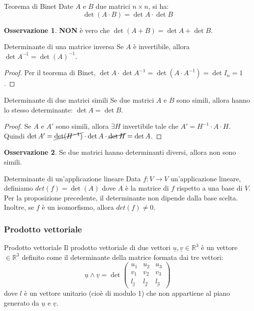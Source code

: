 \documentclass[a4paper]{article}
\theoremstyle{definition}
\newtheorem*{oss}{Osservazione}
\begin{document}
\begin{teo}{Teorema di Binet}{}
	Date $A$ e $B$ due matrici $n \times n$, si ha:
	\begin{equation*}
		\det(A \cdot B) = \det A \cdot \det B
	\end{equation*}
	\begin{oss}
		\textbf{NON} è vero che $\det(A + B) = \det A + \det B$.
	\end{oss}
\end{teo}
\begin{cor}{Determinante di una matrice inversa}{}
	Se $A$ è invertibile, allora $\det A^{-1} = \det(A)^{-1}$.
\end{cor}
\begin{proof}
	Per il teorema di Binet, $\det A \cdot \det A^{-1} = \det(A \cdot A^{-1}) = \det I_n = 1$.
\end{proof}
\begin{cor}{Determinante di due matrici simili}{}
	Se due matrici $A$ e $B$ sono simili, allora hanno lo stesso determinante: $\det A = \det B$.
\end{cor}
\begin{proof}
	Se $A$ e $A'$ sono simili, allora $\exists H$ invertibile tale che $A' = H^{-1} \cdot A \cdot H$.
	Quindi $\det A' = \cancel{\det(H^{-1})} \cdot \det A \cdot \cancel{\det H} = \det A$.
\end{proof}

\begin{oss}
	Se due matrici hanno determinanti diversi, allora non sono simili.
\end{oss}

\begin{deff}{Determinante di un'applicazione lineare}{}
	Data $f: V \rightarrow V$ un'applicazione lineare, definiamo $det(f) = \det(A)$ dove $A$ è la matrice di $f$ rispetto a una base di $V$.
	Per la proposizione precedente, il determinante non dipende dalla base scelta.
	Inoltre, se $f$ è un isomorfismo, allora $det(f) \ne 0$.
\end{deff}

\subsubsection*{Prodotto vettoriale}
\begin{deff}{Prodotto vettoriale}{}
	Il prodotto vettoriale di due vettori $\underline{u}, \underline{v} \in \mathbb{R}^3$ è un vettore $\in \mathbb{R}^3$ definito come il determinante della matrice formata dai tre vettori:
	\begin{equation*}
		\underline{u} \wedge \underline{v} = \det \begin{pmatrix}
			u_1 & u_2 & u_3 \\
			v_1 & v_2 & v_3 \\
			\underline{l_1} & \underline{l_2} & \underline{l_3}
		\end{pmatrix}
	\end{equation*}
	dove $l$ è un vettore unitario (cioè di modulo 1) che non appartiene al piano generato da $\underline{u}$ e $\underline{v}$.
\end{deff}
\end{document}
